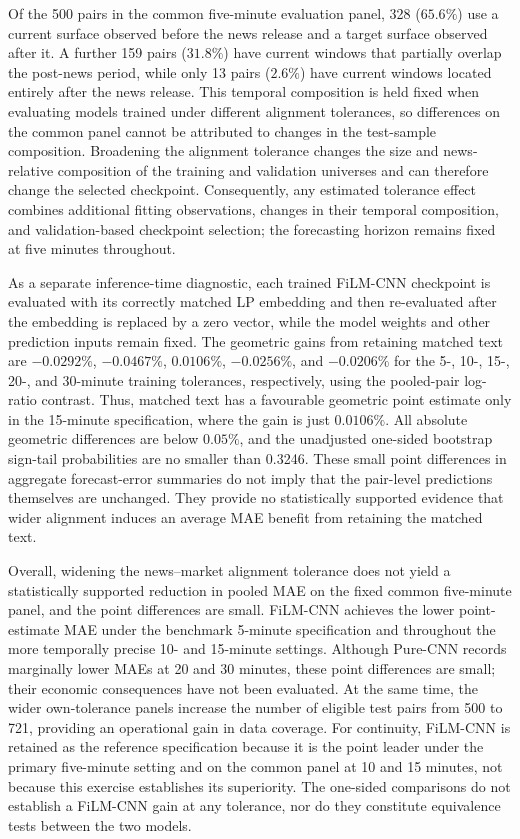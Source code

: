 Of the 500 pairs in the common five-minute evaluation panel, 328
($65.6\%$) use a current surface observed before the news release and a target
surface observed after it. A further 159 pairs ($31.8\%$) have current windows
that partially overlap the post-news period, while only 13 pairs ($2.6\%$)
have current windows located entirely after the news release. This temporal
composition is held fixed when evaluating models trained under different
alignment tolerances, so differences on the common panel cannot be attributed
to changes in the test-sample composition. Broadening the alignment tolerance
changes the size and news-relative composition of the training and validation
universes and can therefore change the selected checkpoint. Consequently, any
estimated tolerance effect combines additional fitting observations, changes
in their temporal composition, and validation-based checkpoint selection; the
forecasting horizon remains fixed at five minutes throughout.


As a separate inference-time diagnostic, each trained FiLM-CNN checkpoint is
evaluated with its correctly matched LP embedding and then re-evaluated after
the embedding is replaced by a zero vector, while the model weights and other
prediction inputs remain fixed. The geometric gains from retaining matched
text are $-0.0292\%$, $-0.0467\%$, $0.0106\%$, $-0.0256\%$, and
$-0.0206\%$ for the 5-, 10-, 15-, 20-, and 30-minute training tolerances,
respectively, using the pooled-pair log-ratio contrast. Thus, matched text
has a favourable geometric point estimate only in the 15-minute
specification, where the gain is just $0.0106\%$.
All absolute geometric differences are below $0.05\%$, and the unadjusted
one-sided bootstrap sign-tail probabilities are no smaller than 0.3246. These
small point differences in aggregate forecast-error summaries do not imply
that the pair-level predictions themselves are unchanged. They provide no
statistically supported evidence that wider alignment induces an average MAE
benefit from retaining the matched text.


Overall, widening the news--market alignment tolerance does not yield a
statistically supported reduction in pooled MAE on the fixed common
five-minute panel, and the point differences are small.
FiLM-CNN achieves the lower point-estimate MAE under the benchmark 5-minute
specification and throughout the more temporally precise 10- and 15-minute
settings. Although Pure-CNN records marginally lower MAEs at 20 and 30
minutes, these point differences are small; their economic consequences have
not been evaluated. At the same time, the
wider own-tolerance panels increase the number of eligible test pairs from 500
to 721, providing an operational gain in data coverage. For continuity,
FiLM-CNN is retained as the reference specification because it is the point
leader under the primary five-minute setting and on the common panel at 10 and
15 minutes, not because this exercise establishes its superiority. The
one-sided comparisons do not establish a FiLM-CNN gain at any tolerance, nor
do they constitute equivalence tests between the two models.




